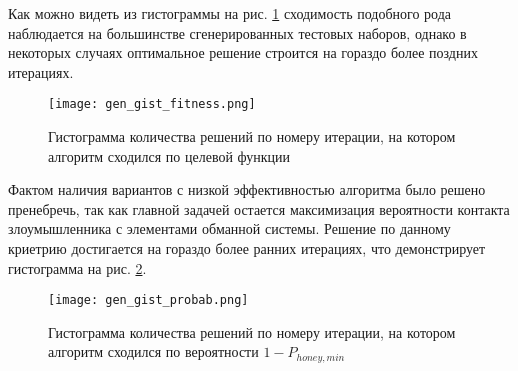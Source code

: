 Как можно видеть из гистограммы на рис. \ref{fig:gen_gist_fitness} сходимость подобного рода наблюдается на большинстве сгенерированных тестовых наборов, однако в некоторых случаях оптимальное решение строится на гораздо более поздних итерациях. 

\begin{figure}[!htbp]
\centering
	\texttt{[image: gen\_gist\_fitness.png]}  
	\caption{Гистограмма количества решений по номеру итерации, на котором алгоритм сходился по целевой функции}
	\label{fig:gen_gist_fitness}
\end{figure}

Фактом наличия вариантов с низкой эффективностью алгоритма было решено пренебречь, так как главной задачей остается максимизация вероятности контакта злоумышленника с элементами обманной системы. Решение по данному криетрию достигается на гораздо более ранних итерациях, что демонстрирует гистограмма на рис. \ref{fig:gen_gist_probab}.

\begin{figure}[ht]
\centering
	\texttt{[image: gen\_gist\_probab.png]}  
	\caption{Гистограмма количества решений по номеру итерации, на котором алгоритм сходился по вероятности $1 - P_{honey, min}$}
	\label{fig:gen_gist_probab}
\end{figure}